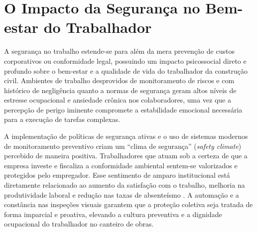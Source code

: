 \section{O Impacto da Segurança no Bem-estar do Trabalhador}
A segurança no trabalho estende-se para além da mera prevenção de custos corporativos ou conformidade legal, possuindo um impacto psicossocial direto e profundo sobre o bem-estar e a qualidade de vida do trabalhador da construção civil. Ambientes de trabalho desprovidos de monitoramento de riscos e com histórico de negligência quanto a normas de segurança geram altos níveis de estresse ocupacional e ansiedade crônica nos colaboradores, uma vez que a percepção de perigo iminente compromete a estabilidade emocional necessária para a execução de tarefas complexas.

A implementação de políticas de segurança ativas e o uso de sistemas modernos de monitoramento preventivo criam um ``clima de segurança'' (\textit{safety climate}) percebido de maneira positiva. Trabalhadores que atuam sob a certeza de que a empresa investe e fiscaliza a conformidade ambiental sentem-se valorizados e protegidos pelo empregador. Esse sentimento de amparo institucional está diretamente relacionado ao aumento da satisfação com o trabalho, melhoria na produtividade laboral e redução nas taxas de absenteísmo \cite{rahman2021context}. A automação e a constância nas inspeções visuais garantem que a proteção coletiva seja tratada de forma imparcial e proativa, elevando a cultura preventiva e a dignidade ocupacional do trabalhador no canteiro de obras.
